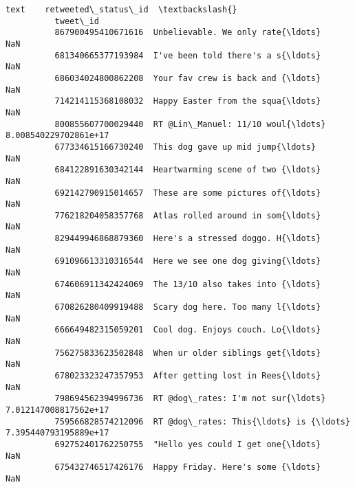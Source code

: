 \documentclass[11pt]{article}
\begin{document}
\begin{Verbatim}[commandchars=\\\{\}]
                                                       text    retweeted\_status\_id  \textbackslash{}
          tweet\_id                                                                   
          867900495410671616  Unbelievable. We only rate{\ldots}                    NaN   
          681340665377193984  I've been told there's a s{\ldots}                    NaN   
          686034024800862208  Your fav crew is back and {\ldots}                    NaN   
          714214115368108032  Happy Easter from the squa{\ldots}                    NaN   
          800855607700029440  RT @Lin\_Manuel: 11/10 woul{\ldots}  8.008540229702861e+17   
          677334615166730240  This dog gave up mid jump{\ldots}                    NaN   
          684122891630342144  Heartwarming scene of two {\ldots}                    NaN   
          692142790915014657  These are some pictures of{\ldots}                    NaN   
          776218204058357768  Atlas rolled around in som{\ldots}                    NaN   
          829449946868879360  Here's a stressed doggo. H{\ldots}                    NaN   
          691096613310316544  Here we see one dog giving{\ldots}                    NaN   
          674606911342424069  The 13/10 also takes into {\ldots}                    NaN   
          670826280409919488  Scary dog here. Too many l{\ldots}                    NaN   
          666649482315059201  Cool dog. Enjoys couch. Lo{\ldots}                    NaN   
          756275833623502848  When ur older siblings get{\ldots}                    NaN   
          678023323247357953  After getting lost in Rees{\ldots}                    NaN   
          798694562394996736  RT @dog\_rates: I'm not sur{\ldots}  7.012147008817562e+17   
          759566828574212096  RT @dog\_rates: This{\ldots} is {\ldots}  7.395440793195889e+17   
          692752401762250755  "Hello yes could I get one{\ldots}                    NaN   
          675432746517426176  Happy Friday. Here's some {\ldots}                    NaN   
          

\end{Verbatim}
\end{document}
